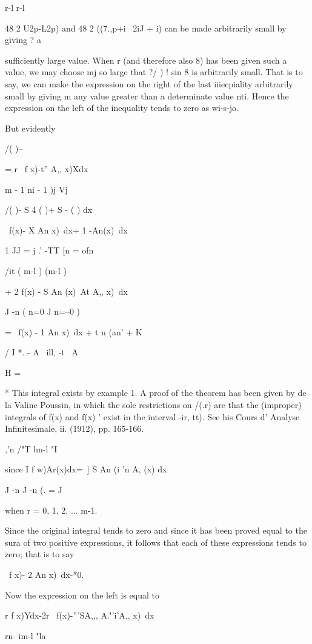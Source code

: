 r-l r-l

48 2 U2p-L2p) and 48 2 ((7.,p+i~ 2iJ + i) can be made arbitrarily
small by giving ? a

sufficiently large value. When r (and therefore also 8) has been given
such a value, we may choose mj so large that ?/ ) ! sin 8 is
arbitrarily small. That is to say, we can make the expression on the
right of the last iiiecpiality arbitrarily small by giving m any value
greater than a determinate value nti. Hence the expression on the left
of the inequality tends to zero as wi-s-jo.

But evidently

/( )-- %

= r \ f x)-t'' A,, x)Xdx

m - 1 ni - 1 )j Vj

/( )- S 4 ( )+ S - ( ) dx

\ f(x)- X An x)\ dx+ 1 -An(x)\ dx

1 JJ = j .' -TT [n = ofn

/it ( m-l ) (m-l )

+ 2 f(x) - S An (x)\ At A,, x)\ dx

J -n ( n=0 J n=--0 )

= \ f(x) - 1 An x)\ dx + t n (an' + K

/ I *. - A \ ill, -t \ A

H =

* This integral exists by example 1. A proof of the theorem has
been given by de la Valine Poussin, in which the sole restrictions on
/(.r) are that the (improper) integrals of f(x) and f(x) ' exist in
the interval -ir, tt). See his Cours d' Analyse Infinitesimale, ii.
(1912), pp. 165-166.

%
%

,'n /"T hn-l "I

since I f w)Ar(x)dx=\ ] S An (i 'n A, (x) dx

J -n J -n (. = J

when r = 0, 1, 2, ... m-1.

Since the original integral tends to zero and since it has been proved
equal to the sura of two positive expressions, it follows that each of
these expressions tends to zero; that is to say

\ f x)- 2 An x)\ dx-*0.

Now the expression on the left is equal to

r f x)Ydx-2r \ f(x)-'''SA,,, A.\'''i'A,, x)\ dx

rn- im-l "la

